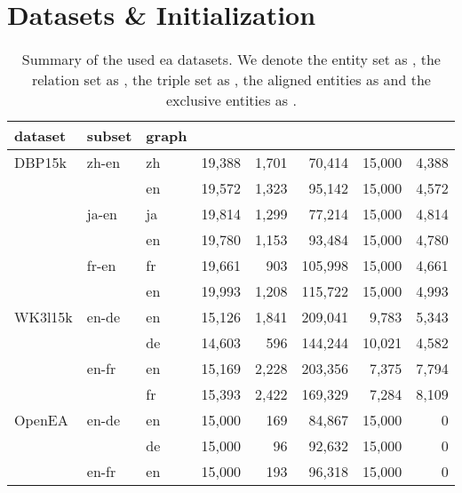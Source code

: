 \documentclass[runningheads]{llncs}
\newcommand{\tablesize}[0]{
\scriptsize
}
\begin{document}
\section{Datasets \& Initialization}
\label{sec:datasets_inits}
\begin{table}
\centering
\caption{
Summary of the used \gls{ea} datasets.
We denote the entity set as , the relation set as , the triple set as , the aligned entities as  and the exclusive entities as .
}
\label{tab:datasets}
\tablesize{}
\begin{tabular*}{\textwidth}{l*{2}{@{\extracolsep{\fill} }l}*{5}{@{\extracolsep{\fill} }r}}
\toprule
dataset & subset & graph&  &  &  &  &  \\
\midrule
DBP15k & zh-en & zh &          19,388 &           1,701 &          70,414 &          15,000 &           4,388 \\
       &     & en &          19,572 &           1,323 &          95,142 &          15,000 &           4,572 \\
       & ja-en & ja &          19,814 &           1,299 &          77,214 &          15,000 &           4,814 \\
       &     & en &          19,780 &           1,153 &          93,484 &          15,000 &           4,780 \\
       & fr-en & fr &          19,661 &             903 &         105,998 &          15,000 &           4,661 \\
       &     & en &          19,993 &           1,208 &         115,722 &          15,000 &           4,993 \\
\midrule
WK3l15k & en-de & en &          15,126 &           1,841 &         209,041 &           9,783 &           5,343 \\
       &     & de &          14,603 &             596 &         144,244 &          10,021 &           4,582 \\
       & en-fr & en &          15,169 &           2,228 &         203,356 &           7,375 &           7,794 \\
       &     & fr &          15,393 &           2,422 &         169,329 &           7,284 &           8,109 \\
\midrule
OpenEA & en-de & en &          15,000 &             169 &          84,867 &          15,000 &               0 \\
       &     & de &          15,000 &              96 &          92,632 &          15,000 &               0 \\
       & en-fr & en &          15,000 &             193 &          96,318 &          15,000 &               0 \\

\end{tabular*}
\end{table}
\end{document}
